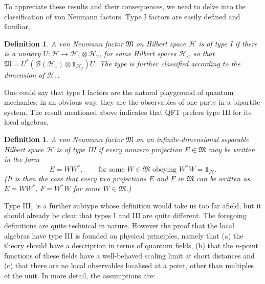 \documentclass[12pt,a4paper]{article}
\newcommand{\1}{\mathds{1}}                         %
\newcommand{\HH}{{\mathcal{H}}}
\newcommand{\Mf}{{\mathfrak{M}}}
\newcommand{\II}{{\mathbb{1}}}
\newcommand{\Bc}{{\mathcal{B}}}
\newtheorem{definition}[theorem]{Definition}
\begin{document}
 



To appreciate these results and their consequences, we need to delve into the classification of von Neumann factors. Type I factors are easily defined and familiar.
\begin{definition}\label{def:typeI}
	A von Neumann factor $\Mf$ on Hilbert space $\HH$ is of \emph{type I} if there is a unitary $U:\HH\to\HH_1\otimes\HH_2$, for some Hilbert spaces $\HH_i$, so that $\Mf=U^*(\Bc(\HH_1)\otimes\II_{\HH_2}) U$. 
	The type is further classified according to the dimension of $\HH_1$.
\end{definition}
One could say that type I factors are the natural playground of quantum mechanics: in an obvious way, they are the observables of one party in a bipartite system.
The result mentioned above indicates that QFT prefers type III for its local algebras.
\begin{definition}
	A von Neumann factor $\Mf$ on an infinite-dimensional separable Hilbert space $\HH$ is of \emph{type III} if every nonzero projection $E\in\Mf$ may be written in the form 
	\[
	E = WW^*, \qquad \text{for some $W\in\Mf$ obeying $W^*W=\II_\HH$.}
	\]
	(It is then the case that every two projections $E$ and $F$ in $\Mf$ can be written as $E=WW^*$, $F=W^*W$ for some $W\in\Mf$.) 
\end{definition} 
Type III${}_1$ is a further subtype whose definition would take us too far afield, but it should already be clear that types I and III are quite different. The foregoing definitions are quite technical in nature. However the proof that the local algebras have type III is founded on physical principles, namely that (a) the theory should have a description in terms of quantum fields, (b) that the $n$-point functions of these fields have a well-behaved scaling limit at short distances and (c) that there are no local observables localised at a point, other than multiples of the unit. In more detail, the assumptions are:
\end{document}
